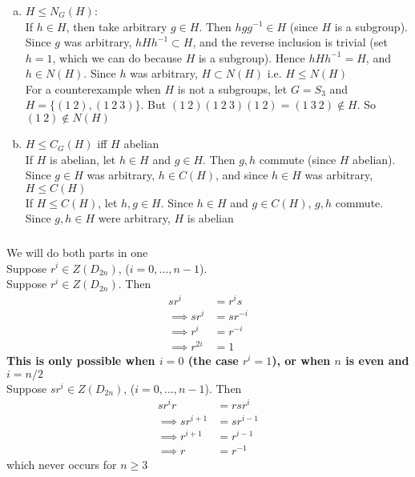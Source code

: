 \documentclass{article}
\newcommand{\set}[1]{ \{ #1 \} }
\newcommand{\inv}[1]{ {#1}^{-1} }
\begin{document}
\subsubsection{}\label{ex2p6}
\begin{enumerate}[(a)]
\item $H \leq N_G(H)$:\\
If $h \in H$, then take arbitrary $g \in H$. Then $hg\inv{g} \in H$ (since $H$ is a subgroup). Since $g$ was arbitrary, $hH\inv{h} \subset H$, and the reverse inclusion is trivial (set $h=1$, which we can do because $H$ is a subgroup). Hence $hH\inv{h} = H$, and $h \in N(H)$. Since $h$ was arbitrary, $H \subset N(H)$ i.e. $H \leq N(H)$\\
For a counterexample when $H$ is not a subgroups, let $G=S_3$ and $H = \set{(1\ 2), (1\ 2\ 3)}$. But $(1\ 2)(1\ 2\ 3)(1\ 2) = (1\ 3\ 2) \notin H$. So $(1\ 2) \notin N(H)$
\item $H \leq C_G(H)$ iff $H$ abelian\\ 
If $H$ is abelian, let $h \in H$ and $g \in H$. Then $g,h$ commute (since $H$ abelian). Since $g \in H$ was arbitrary, $h \in C(H)$, and since $h\in H$ was arbitrary, $H \leq C(H)$\\
If $H \leq C(H)$, let $h,g\in H$. Since $h\in H$ and $g\in C(H)$, $g,h$ commute. Since $g,h \in H$ were arbitrary, $H$ is abelian
\end{enumerate}
\subsubsection{}\label{ex2p7}
We will do both parts in one\\
Suppose $r^i \in Z(D_{2n})$, ($i=0,\ldots,n-1$).\\
Suppose $r^i\in Z(D_{2n})$. Then
\begin{align*}
sr^i &= r^is\\
\implies sr^i &= sr^{-i}\\
\implies r^i &= r^{-i}\\
\implies r^{2i} &= 1
\end{align*}
\textbf{This is only possible when $i=0$ (the case $r^i = 1$), or when $n$ is even and $i = n/2$}\\
Suppose $sr^i \in Z(D_{2n})$, ($i=0,\ldots,n-1$). Then
\begin{align*}
sr^ir &= rsr^i\\
\implies sr^{i+1} &= sr^{i-1}\\
\implies r^{i+1} &= r^{i-1}\\
\implies r&= \inv{r}
\end{align*}
which never occurs for $n \geq 3$
\end{document}
